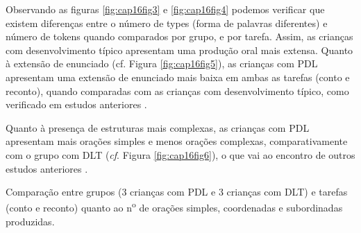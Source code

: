 \documentclass[output=paper,colorlinks,citecolor=brown,booklanguage=portuguese]{langscibook}
\begin{document}
Observando as figuras \ref{fig:cap16fig3} e \ref{fig:cap16fig4} podemos verificar que existem diferenças entre o número de types (forma de palavras diferentes) e número de tokens quando comparados por grupo, e por tarefa. Assim, as crianças com desenvolvimento típico apresentam uma produção oral mais extensa. Quanto à extensão de enunciado (cf. Figura \ref{fig:cap16fig5}), as crianças com PDL apresentam uma extensão de enunciado mais baixa em ambas as tarefas (conto e reconto), quando comparadas com as crianças com desenvolvimento típico, como verificado em estudos anteriores \citep{Gillam1992, Fey2004, BefiLopes2008, Balciuniene2016, Kraljevic2020}. 

Quanto à presença de estruturas mais complexas, as crianças com PDL apresentam mais orações simples e menos orações complexas, comparativamente com o grupo com DLT (\emph{cf}. Figura \ref{fig:cap16fig6}), o que vai ao encontro de outros estudos anteriores \citep{Costa2006, Newman2006, Monteiro2016}.
\begin{Figura}
        \dataset

    \caption{{Comparação entre grupos (3 crianças com PDL e 3 crianças com DLT) e tarefas (conto e reconto) quanto ao n\textsuperscript{o} de orações simples, coordenadas e subordinadas produzidas.}}
    \label{fig:cap16fig6}
\end{Figura}
\end{document}
